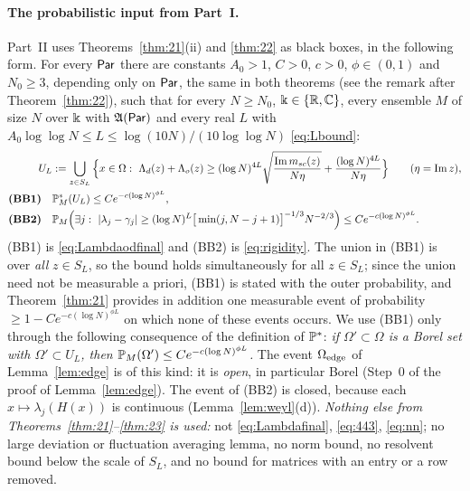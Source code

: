 \paragraph{The probabilistic input from Part~I.} Part~II uses Theorems~\ref{thm:21}(ii) and \ref{thm:22} as black boxes, in the following form.
For every $\Par$ there are constants $A_0>1$, $C>0$, $c>0$, $\phi\in(0,1)$ and $N_0\ge3$, depending only on $\Par$, the same in both
theorems (see the remark after Theorem~\ref{thm:22}), such that for every $N\ge N_0$, $\K\in\{\R,\C\}$, every ensemble $M$ of size $N$ over $\K$
with $\fA(\Par)$ and every real $L$ with $A_0\log\log N\le L\le\log(10N)/(10\log\log N)$ \eqref{eq:Lbound}:
\begin{align*}
U_L&:=\bigcup_{z\in S_L}\Big\{x\in\Omega:\ \Lambda_d(z)+\Lambda_o(z)\ge(\log N)^{4L}\sqrt{\frac{\im\msc(z)}{N\eta}}+\frac{(\log N)^{4L}}{N\eta}\Big\}\qquad(\eta=\im z),\\
\textbf{(BB1)}\quad&\P^*_M(U_L)\le Ce^{-c(\log N)^{\phi L}},\\
\textbf{(BB2)}\quad&\P_M\Big(\exists j:\ |\lambda_j-\gamma_j|\ge(\log N)^{L}\big[\min(j,N-j+1)\big]^{-1/3}N^{-2/3}\Big)\le Ce^{-c(\log N)^{\phi L}}.
\end{align*}
(BB1) is \eqref{eq:Lambdaodfinal} and (BB2) is \eqref{eq:rigidity}. The union in (BB1) is over \emph{all} $z\in S_L$, so the bound holds
simultaneously for all $z\in S_L$; since the union need not be measurable a priori, (BB1) is stated with the outer probability, and
Theorem~\ref{thm:21} provides in addition one measurable event of probability $\ge1-Ce^{-c(\log N)^{\phi L}}$ on which none of these events occurs.
We use (BB1) only through the following consequence of the definition of $\P^*$:
\emph{if $\Omega'\subset\Omega$ is a Borel set with $\Omega'\subset U_L$, then $\P_M(\Omega')\le Ce^{-c(\log N)^{\phi L}}$.}
The event $\Omega_{\rm edge}$ of Lemma~\ref{lem:edge} is of this kind: it is \emph{open}, in particular Borel (Step~0 of the proof of Lemma~\ref{lem:edge}). The event of (BB2) is closed, because each $x\mapsto\lambda_j(H(x))$ is continuous
(Lemma~\ref{lem:weyl}(d)).
\emph{Nothing else from Theorems~\ref{thm:21}--\ref{thm:23} is used:} not \eqref{eq:Lambdafinal}, \eqref{eq:443}, \eqref{eq:nn}; no large deviation
or fluctuation averaging lemma, no norm bound, no resolvent bound below the scale of $S_L$, and no bound for matrices with an entry or a row removed.

